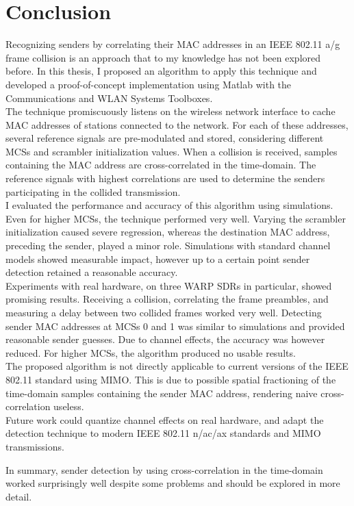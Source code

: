 
\chapter{Conclusion}\label{ch:Conclusion}
\glsresetall %

Recognizing senders by correlating their \gls{MAC} addresses in an IEEE 802.11 a/g frame collision is an approach that to my knowledge has not been explored before. In this thesis, I proposed an algorithm to apply this technique and developed a proof-of-concept implementation using Matlab with the Communications and WLAN Systems Toolboxes.\\

The technique promiscuously listens on the wireless network interface to cache \gls{MAC} addresses of stations connected to the network. For each of these addresses, several reference signals are pre-modulated and stored, considering different \glspl{MCS} and scrambler initialization values. When a collision is received, samples containing the \gls{MAC} address are cross-correlated in the time-domain. The reference signals with highest correlations are used to determine the senders participating in the collided transmission.\\

I evaluated the performance and accuracy of this algorithm using simulations. Even for higher \glspl{MCS}, the technique performed very well. Varying the scrambler initialization caused severe regression, whereas the destination \gls{MAC} address, preceding the sender, played a minor role. Simulations with standard channel models showed measurable impact, however up to a certain point sender detection retained a reasonable accuracy.\\

Experiments with real hardware, on three \gls{WARP} \glspl{SDR} in particular, showed promising results. Receiving a collision, correlating the frame preambles, and measuring a delay between two collided frames worked very well. Detecting sender \gls{MAC} addresses at \glspl{MCS} 0 and 1 was similar to simulations and provided reasonable sender guesses. Due to channel effects, the accuracy was however reduced. For higher \glspl{MCS}, the algorithm produced no usable results.\\

The proposed algorithm is not directly applicable to current versions of the IEEE 802.11 standard using \gls{MIMO}. This is due to possible spatial fractioning of the time-domain samples containing the sender \gls{MAC} address, rendering naive cross-correlation useless.\\

Future work could quantize channel effects on real hardware, and adapt the detection technique to modern IEEE 802.11 n/ac/ax standards and \gls{MIMO} transmissions.

In summary, sender detection by using cross-correlation in the time-domain worked surprisingly well despite some problems and should be explored in more detail.
